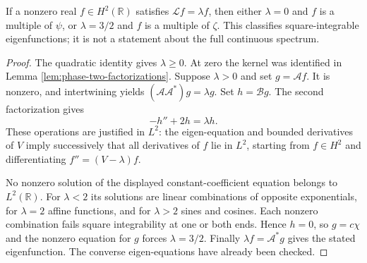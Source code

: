 \begin{proposition}\label{prop:phase-normal-point-spectrum}
If a nonzero real $f\in H^2(\mathbb R)$ satisfies $\mathscr Lf=\lambda f$, then either $\lambda=0$ and $f$ is a multiple of $\psi$, or $\lambda=3/2$ and $f$ is a multiple of $\zeta$. This classifies square-integrable eigenfunctions; it is not a statement about the full continuous spectrum.
\end{proposition}
\begin{proof}
The quadratic identity gives $\lambda\geq0$. At zero the kernel was identified in Lemma \ref{lem:phase-two-factorizations}. Suppose $\lambda>0$ and set $g=\mathcal A f$. It is nonzero, and intertwining yields
$(\mathcal A\mathcal A^*)g=\lambda g$. Set $h=\mathcal B g$. The second factorization gives
\[
 -h''+2h=\lambda h.
\]
These operations are justified in $L^2$: the eigen-equation and bounded derivatives of $V$ imply successively that all derivatives of $f$ lie in $L^2$, starting from $f\in H^2$ and differentiating $f''=(V-\lambda)f$.

No nonzero solution of the displayed constant-coefficient equation belongs to $L^2(\mathbb R)$. For $\lambda<2$ its solutions are linear combinations of opposite exponentials, for $\lambda=2$ affine functions, and for $\lambda>2$ sines and cosines. Each nonzero combination fails square integrability at one or both ends. Hence $h=0$, so $g=c\chi$ and the nonzero equation for $g$ forces $\lambda=3/2$. Finally $\lambda f=\mathcal A^*g$ gives the stated eigenfunction. The converse eigen-equations have already been checked.
\end{proof}

